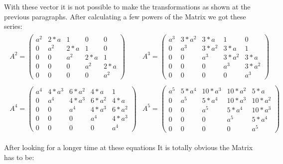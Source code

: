 With these vector it is not possible to make the transformations as shown at the previous paragraphs.
After calculating a few powers of the Matrix we got these series:
\begin{gather*}
\begin{array}{cc}
A^2=
	\left( \begin{array}{ccccc}
		a^2 &  2*a&    1&    0&    0\\
		0&  a^2&  2*a&    1&    0 \\
		0&    0&  a^2&  2*a&    1\\
		0&    0&    0&  a^2&  2*a \\
		0&    0&    0&    0&  a^2
	\end{array} \right)
	&
A^3=
	\left( \begin{array}{ccccc}
		a^3& 3*a^2&   3*a&     1&    0\\
		0&   a^3& 3*a^2&   3*a&     1\\
		0&     0&  a^3& 3*a^2&   3*a\\
		0&     0&    0&   a^3& 3*a^2\\
		0&     0&    0&     0&   a^3
	\end{array} \right)
	\\ \\
A^4=
	\left( \begin{array}{ccccc}
		a^4& 4*a^3& 6*a^2&  4*a&    1\\
		0&   a^4 & 4*a^3& 6*a^2&   4*a\\
		0&     0&   a^4& 4*a^3& 6*a^2\\
		0&     0&     0&   a^4& 4*a^3\\
		0&     0&     0&     0&   a^4
	\end{array} \right)
	&
A^5=
	\left( \begin{array}{ccccc}
		a^5& 5*a^4& 10*a^3& 10*a^2&    5*a\\
		0&   a^5&  5*a^4& 10*a^3& 10*a^2\\
		0&     0&    a^5&  5*a^4& 10*a^3\\
		0&     0&      0&    a^5&  5*a^4\\
		0&     0&      0&      0&    a^5
	\end{array} \right)
\end{array}
\end{gather*}

After looking for a longer time at these equations It is totally obvious the Matrix has to be:

